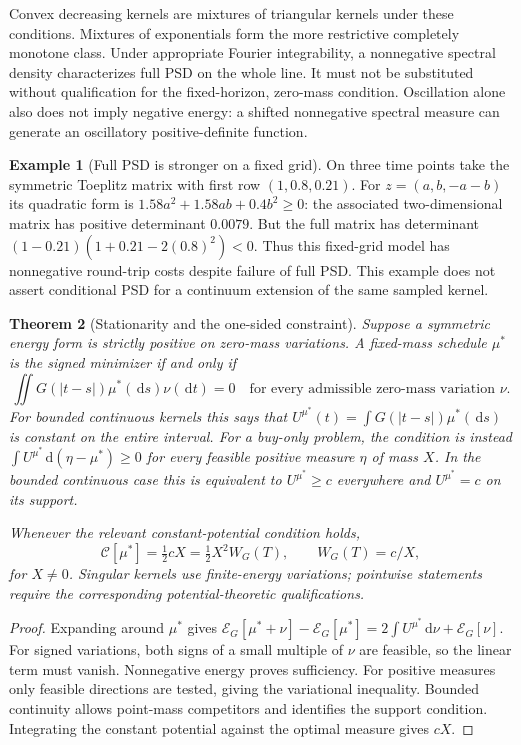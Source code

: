 \documentclass[11pt]{article}
\numberwithin{equation}{section}
\newtheorem{theorem}{Theorem}[section]
\theoremstyle{definition}
\theoremstyle{remark}
\theoremstyle{definition}
\newtheorem{example}[theorem]{Example}
\newcommand{\dd}{\,\mathrm d}
\begin{document}
Convex decreasing kernels are mixtures of triangular kernels under these
conditions. Mixtures of exponentials form the more restrictive completely
monotone class. Under appropriate Fourier integrability, a nonnegative spectral
density characterizes full PSD on the whole line. It must not be substituted
without qualification for the fixed-horizon, zero-mass condition. Oscillation
alone also does not imply negative energy: a shifted nonnegative spectral
measure can generate an oscillatory positive-definite function.

\begin{example}[Full PSD is stronger on a fixed grid]
On three time points take the symmetric Toeplitz matrix with first row
$(1,0.8,0.21)$. For $z=(a,b,-a-b)$ its quadratic form is
$1.58a^2+1.58ab+0.4b^2\geq0$: the associated two-dimensional matrix has
positive determinant $0.0079$. But the full matrix has determinant
$(1-0.21)(1+0.21-2(0.8)^2)<0$. Thus this fixed-grid model has nonnegative
round-trip costs despite failure of full PSD. This example does not assert
conditional PSD for a continuum extension of the same sampled kernel.
\end{example}

\begin{theorem}[Stationarity and the one-sided constraint]\label{thm:equilibrium}
Suppose a symmetric energy form is strictly positive on zero-mass variations.
A fixed-mass schedule $\mu^*$ is the signed minimizer if and only if
\begin{equation}\label{eq:equil}
 \iint G(|t-s|)\mu^*(\dd s)\nu(\dd t)=0
 \quad\text{for every admissible zero-mass variation }\nu.
\end{equation}
For bounded continuous kernels this says that
$U^{\mu^*}(t)=\int G(|t-s|)\mu^*(\dd s)$ is constant on the entire interval.
For a buy-only problem, the condition is instead
$\int U^{\mu^*}\dd(\eta-\mu^*)\geq0$ for every feasible positive measure
$\eta$ of mass $X$. In the bounded continuous case this is equivalent to
$U^{\mu^*}\geq c$ everywhere and $U^{\mu^*}=c$ on its support.

Whenever the relevant constant-potential condition holds,
\begin{equation}\label{eq:mincost}
 \mathcal C[\mu^*]=\tfrac12cX=\tfrac12X^2W_G(T),\qquad W_G(T)=c/X,
\end{equation}
for $X\ne0$. Singular kernels use finite-energy variations; pointwise
statements require the corresponding potential-theoretic qualifications.
\end{theorem}
\begin{proof}
Expanding around $\mu^*$ gives
$\mathcal E_G[\mu^*+\nu]-\mathcal E_G[\mu^*]
=2\int U^{\mu^*}\dd\nu+\mathcal E_G[\nu]$.
For signed variations, both signs of a small multiple of $\nu$ are feasible,
so the linear term must vanish. Nonnegative energy proves sufficiency.
For positive measures only feasible directions are tested, giving the
variational inequality. Bounded continuity allows point-mass competitors and
identifies the support condition. Integrating the constant potential against
the optimal measure gives $cX$.
\end{proof}
\end{document}
